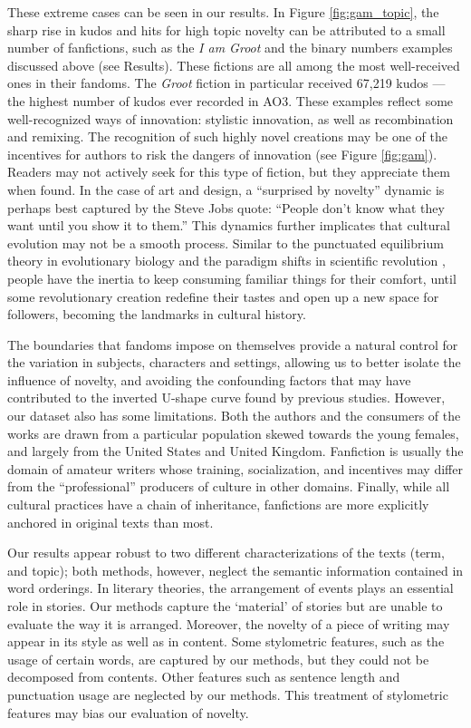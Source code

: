 \documentclass[letterpaper]{article} %
\begin{document}
These extreme cases can be seen in our results. 
In Figure \ref{fig:gam_topic}, the sharp rise in kudos and hits for high topic novelty can be attributed to a small number of fanfictions, such as the \emph{I am Groot} and the binary numbers examples discussed above (see Results). These fictions are all among the most well-received ones in their fandoms. The \emph{Groot} fiction in particular received 67,219 kudos --- the highest number of kudos ever recorded in AO3. These examples reflect some well-recognized ways of innovation: stylistic innovation, as well as recombination and remixing. The recognition of such highly novel creations may be one of the incentives for authors to risk the dangers of innovation (see Figure \ref{fig:gam}). Readers may not actively seek for this type of fiction, but they appreciate them when found. In the case of art and design, a ``surprised by novelty'' dynamic is perhaps best captured by the Steve Jobs quote: ``People don't know what they want until you show it to them.'' This dynamics further implicates that cultural evolution may not be a smooth process. Similar to the punctuated equilibrium theory in evolutionary biology \cite{gould1972punctuated} and the paradigm shifts in scientific revolution \cite{kuhn2012structure}, people have the inertia to keep consuming familiar things for their comfort, until some revolutionary creation redefine their tastes and open up a new space for followers, becoming the landmarks in cultural history.

The boundaries that fandoms impose on themselves provide a natural control for the variation in subjects, characters and settings, allowing us to better isolate the influence of novelty, and avoiding the confounding factors that may have contributed to the inverted U-shape curve found by previous studies. However, our dataset also has some limitations. Both the authors and the consumers of the works are drawn from a particular population skewed towards the young females, and largely from the United States and United Kingdom. Fanfiction is usually the domain of amateur writers whose training, socialization, and incentives may differ from the ``professional'' producers of culture in other domains. Finally, while all cultural practices have a chain of inheritance, fanfictions are more explicitly anchored in original texts than most.

Our results appear robust to two different characterizations of the texts (term, and topic); both methods, however, neglect the semantic information contained in word orderings. In literary theories, the arrangement of events plays an essential role in stories. Our methods capture the `material’ of stories but are unable to evaluate the way it is arranged. Moreover, the novelty of a piece of writing may appear in its style as well as in content. Some stylometric features, such as the usage of certain words, are captured by our methods, but they could not be decomposed from contents. Other features such as sentence length and punctuation usage are neglected by our methods. This treatment of stylometric features may bias our evaluation of novelty.
\end{document}
